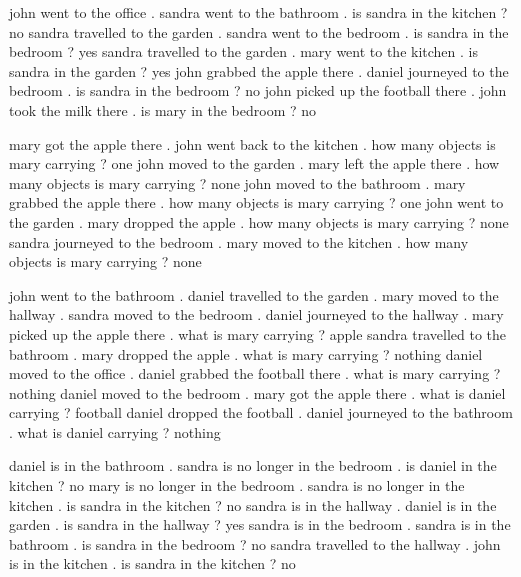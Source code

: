 \begin{tcbraster}[raster columns=2, size=minimal, raster valign=top]
    \begin{tcolorbox}[mybox, title=Task 6:Name, height fill] 
    \tiny
 john went to the office . sandra went to the bathroom . is sandra in the kitchen ? no sandra travelled to the garden . sandra went to the bedroom . is sandra in the bedroom ? yes sandra travelled to the garden . mary went to the kitchen . is sandra in the garden ? yes john grabbed the apple there . daniel journeyed to the bedroom . is sandra in the bedroom ? no john picked up the football there . john took the milk there . is mary in the bedroom ? no
    \end{tcolorbox}    



    \begin{tcolorbox}[mybox, title=Task 7:Name, height fill] 
    \tiny
mary got the apple there . john went back to the kitchen . how many objects is mary carrying ? one john moved to the garden . mary left the apple there . how many objects is mary carrying ? none john moved to the bathroom . mary grabbed the apple there . how many objects is mary carrying ? one john went to the garden . mary dropped the apple . how many objects is mary carrying ? none sandra journeyed to the bedroom . mary moved to the kitchen . how many objects is mary carrying ? none
    \end{tcolorbox}  


    \begin{tcolorbox}[mybox, title=Task 8:Name, height fill] 
    \tiny
 john went to the bathroom . daniel travelled to the garden . mary moved to the hallway . sandra moved to the bedroom . daniel journeyed to the hallway . mary picked up the apple there . what is mary carrying ? apple sandra travelled to the bathroom . mary dropped the apple . what is mary carrying ? nothing daniel moved to the office . daniel grabbed the football there . what is mary carrying ? nothing daniel moved to the bedroom . mary got the apple there . what is daniel carrying ? football daniel dropped the football . daniel journeyed to the bathroom . what is daniel carrying ? nothing
    \end{tcolorbox}    



    \begin{tcolorbox}[mybox, title=Task 9:Name, height fill] 
    \tiny
daniel is in the bathroom . sandra is no longer in the bedroom . is daniel in the kitchen ? no mary is no longer in the bedroom . sandra is no longer in the kitchen . is sandra in the kitchen ? no sandra is in the hallway . daniel is in the garden . is sandra in the hallway ? yes sandra is in the bedroom . sandra is in the bathroom . is sandra in the bedroom ? no sandra travelled to the hallway . john is in the kitchen . is sandra in the kitchen ? no
    \end{tcolorbox}  



\end{tcbraster}
